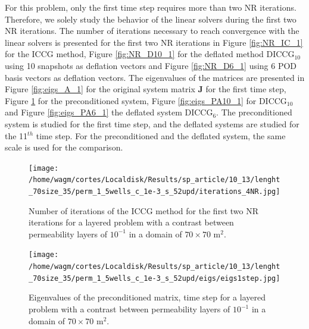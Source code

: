 \documentclass[12pt]{article}
\begin{document}
For this problem, only the first time step requires more than two NR iterations. Therefore, we solely study the 
behavior of the linear solvers during the first two NR iterations. The number of iterations necessary to reach 
convergence with the linear solvers is presented for the first two NR iterations in Figure \ref{fig:NR_IC_1} 
for the ICCG method, Figure \ref{fig:NR_D10_1} for the deflated method DICCG$_{10}$ using 10 snapshots as 
deflation vectors and Figure \ref{fig:NR_D6_1} using 6 POD basis vectors as deflation vectors.
The eigenvalues of the matrices are presented in Figure \ref{fig:eigs_A_1} for the original system matrix 
$\mathbf{J}$ for the first time step, Figure \ref{fig:eigs_MA_1} for the preconditioned system, Figure 
\ref{fig:eigs_PA10_1} for DICCG$_{10}$ and Figure \ref{fig:eigs_PA6_1} the deflated system DICCG$_6$. 
The preconditioned system is studied for the first time step, and the deflated systems are studied for the 11$^{th}$ 
time step. For the preconditioned and the deflated system, the same scale is used for the comparison.\\


\begin{figure}[!h]
\centering
\begin{minipage}{.4\textwidth}
\vspace{-0.9cm}
\hspace{-1cm}
\texttt{[image: /home/wagm/cortes/Localdisk/Results/sp\_article/10\_13/lenght\_70size\_35/perm\_1\_5wells\_c\_1e-3\_s\_52upd/iterations\_4NR.jpg]}
\vspace{-1.3cm}
\caption{Number of iterations of the ICCG method for the first two NR iterations for a layered problem with a contrast between permeability layers of $10^{-1}$ in a domain of $70 \times 70$ m$^2$.}
\label{fig:NR_IC_1}
\end{minipage}%
\hspace{15mm}
\begin{minipage}{.4\textwidth}
 \centering
 \vspace{-5mm}
\texttt{[image: /home/wagm/cortes/Localdisk/Results/sp\_article/10\_13/lenght\_70size\_35/perm\_1\_5wells\_c\_1e-3\_s\_52upd/eigs/eigs1step.jpg]}
\caption{Eigenvalues of the preconditioned matrix, time step for a layered problem with a contrast between permeability layers of $10^{-1}$ in a domain of $70 \times 70$ m$^2$.}
\label{fig:eigs_MA_1}
\end{minipage}
\end{figure}
\end{document}
